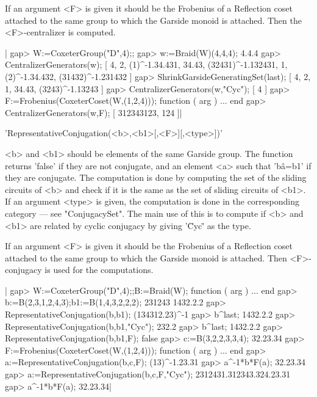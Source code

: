 If  an argument  <F> is  given it  should be  the Frobenius of a Reflection
coset  attached to the same group to  which the Garside monoid is attached.
Then the <F>-centralizer is computed.

|    gap> W:=CoxeterGroup("D",4);;
    gap> w:=Braid(W)(4,4,4);
    4.4.4
    gap> CentralizerGenerators(w);
    [ 4, 2, (1)^-1.34.431, 34.43, (32431)^-1.132431, 1, (2)^-1.34.432,
      (31432)^-1.231432 ]
    gap> ShrinkGarsideGeneratingSet(last);
    [ 4, 2, 1, 34.43, (3243)^-1.13243 ]
    gap> CentralizerGenerators(w,"Cyc");
    [ 4 ]
    gap> F:=Frobenius(CoxeterCoset(W,(1,2,4)));
    function ( arg ) ... end
    gap> CentralizerGenerators(w,F);
    [ 312343123, 124 ]|



'RepresentativeConjugation(<b>,<b1>[,<F>][,<type>])'

<b>  and <b1> should  be elements of  the same Garside  group. The function
returns  'false' if they  are not conjugate,  and an element  <a> such that
'b\^a=b1'  if they are conjugate. The  computation is done by computing the
set  of the sliding circuits of <b> and check  if it is the same as the set
of  sliding  circuits  of  <b1>.  If  an  argument  <type>  is  given,  the
computation  is done in the  corresponding category --- see "ConjugacySet".
The  main use of this is  to compute if <b> and  <b1> are related by cyclic
conjugacy by giving '\"Cyc\"' as the type.

If  an argument  <F> is  given it  should be  the Frobenius of a Reflection
coset  attached to the same group to  which the Garside monoid is attached.
Then <F>-conjugacy is used for the computations.

|    gap> W:=CoxeterGroup("D",4);;B:=Braid(W);
    function ( arg ) ... end
    gap> b:=B(2,3,1,2,4,3);b1:=B(1,4,3,2,2,2);
    231243
    1432.2.2
    gap> RepresentativeConjugation(b,b1);
    (134312.23)^-1
    gap> b^last;
    1432.2.2
    gap> RepresentativeConjugation(b,b1,"Cyc");
    232.2
    gap> b^last;
    1432.2.2
    gap> RepresentativeConjugation(b,b1,F);
    false
    gap> c:=B(3,2,2,3,3,4);
    32.23.34
    gap> F:=Frobenius(CoxeterCoset(W,(1,2,4)));
    function ( arg ) ... end
    gap> a:=RepresentativeConjugation(b,c,F);
    (13)^-1.23.31
    gap> a^-1*b*F(a);
    32.23.34
    gap> a:=RepresentativeConjugation(b,c,F,"Cyc");
    2312431.312343.324.23.31
    gap> a^-1*b*F(a);
    32.23.34|

